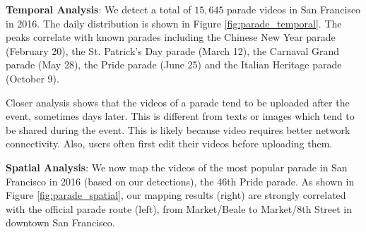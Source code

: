 \documentclass[sigconf]{acmart}
\begin{document}
	\noindent \textbf{Temporal Analysis}: We detect a total of $15,645$ parade videos in San Francisco in 2016. The daily distribution is shown in Figure \ref{fig:parade_temporal}. The peaks correlate with known parades including the Chinese New Year parade (February 20), the St. Patrick's Day parade (March 12), the Carnaval Grand parade (May 28), the Pride parade (June 25) and the Italian Heritage parade (October 9).
	
	Closer analysis shows that the videos of a parade tend to be uploaded after the event, sometimes days later. This is different from texts or images which tend to be shared during the event. This is likely because video requires better network connectivity. Also, users often first edit their videos before uploading them.
	
	
	\noindent \textbf{Spatial Analysis}: We now map the videos of the most popular parade in San Francisco in 2016 (based on our detections), the 46th Pride parade. As shown in Figure \ref{fig:parade_spatial}, our mapping results (right) are strongly correlated with the official parade route (left), from Market/Beale to Market/8th Street in downtown San Francisco.
	
	
	
\end{document}
